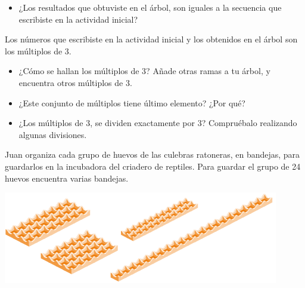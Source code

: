 \documentclass[10pt,twoside]{article}
\begin{document}
\begin{itemize}
\item ¿Los resultados que obtuviste en el árbol, son
iguales a la secuencia que escribiste en la actividad
inicial?
\end{itemize}
Los números que escribiste en la actividad inicial y los
obtenidos en el árbol son los múltiplos de 3.
\begin{itemize}
\item ¿Cómo se hallan los múltiplos de 3? Añade otras ramas a tu árbol, y encuentra otros múltiplos de 3.
\item ¿Este conjunto de múltiplos tiene último elemento?
¿Por qué?
\item ¿Los múltiplos de 3, se dividen exactamente por 3?
Compruébalo realizando algunas divisiones.
\end{itemize}
Juan organiza cada grupo de huevos de las culebras ratoneras, en bandejas, para guardarlos en la incubadora del criadero de reptiles. Para guardar el grupo de 24 huevos encuentra varias bandejas.
\begin{center}
\includegraphics[scale=.75]{Images/huevos.png} 
\end{center}
\end{document}
